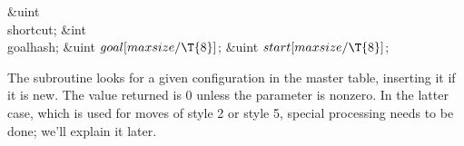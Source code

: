 \&{uint} \\{shortcut};\6
\&{int} \\{goalhash};\6
\&{uint} ${}\\{goal}[\\{maxsize}/\T{8}]{}$;\6
\&{uint} ${}\\{start}[\\{maxsize}/\T{8}]{}$;\par
\fi

The  subroutine looks for a given 
configuration in the
master table, inserting it if it is new.
The value returned is 0 unless the  parameter is nonzero.
In the latter case, which is used for moves of style 2 or style 5,
special processing needs to be done; we'll explain it later.


